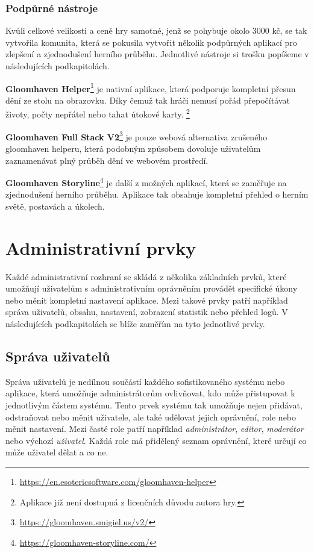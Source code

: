 \subsubsection*{Podpůrné nástroje}
\label{subsubsec:popular-board-games-analysis-gloomhaven-support-tools}
Kvůli celkové velikosti a ceně hry samotné, jenž se pohybuje okolo 3000 kč, se tak vytvořila komunita, která se pokusila vytvořit několik podpůrných aplikací pro zlepšení a zjednodušení herního průběhu. Jednotlivé nástroje si trošku popíšeme v následujících podkapitolách.

\begin{description}
    \item \textbf{Gloomhaven Helper}\footnote{\href{https://en.esotericsoftware.com/gloomhaven-helper}{https://en.esotericsoftware.com/gloomhaven-helper}} je nativní aplikace, která podporuje kompletní přesun dění ze stolu na obrazovku. Díky čemuž tak hráči nemusí pořád přepočítávat životy, počty nepřátel nebo tahat útokové karty. \footnote{Aplikace již není dostupná z licenčních důvodu autora hry.}
    \item \textbf{Gloomhaven Full Stack V2}\footnote{\href{https://gloomhaven.smigiel.us/v2/}{https://gloomhaven.smigiel.us/v2/}} je pouze webová alternativa zrušeného gloomhaven helperu, která podobným způsobem dovoluje uživatelům zaznamenávat plný průběh dění ve webovém prostředí.
    \item \textbf{Gloomhaven Storyline}\footnote{\href{https://gloomhaven-storyline.com/}{https://gloomhaven-storyline.com/}} je další z možných aplikací, která se zaměřuje na zjednodušení herního průběhu. Aplikace tak obsahuje kompletní přehled o herním světě, postavách a úkolech.
\end{description}

\section{Administrativní prvky}
\label{sec:admin-elements}
Každé administrativní rozhraní se skládá z několika základních prvků, které umožňují uživatelům s administrativním oprávněním provádět specifické úkony nebo měnit kompletní nastavení aplikace. Mezi takové prvky patří například správa uživatelů, obsahu, nastavení, zobrazení statistik nebo přehled logů. V následujících podkapitolách se blíže zaměřím na tyto jednotlivé prvky.

\subsection{Správa uživatelů}
\label{subsec:admin-elements-user-management}
Správa uživatelů je nedílnou součástí každého sofistikovaného systému nebo aplikace, která umožňuje administrátorům ovlivňovat, kdo může přistupovat k jednotlivým částem systému. Tento prvek systému tak umožňuje nejen přidávat, odstraňovat nebo měnit uživatele, ale také udělovat jejich oprávnění, role nebo měnit nastavení. Mezi časté role patří například \textit{administrátor}, \textit{editor}, \textit{moderátor} nebo výchozí \textit{uživatel}. Každá role má přidělený seznam oprávnění, které určují co může uživatel dělat a co ne.

